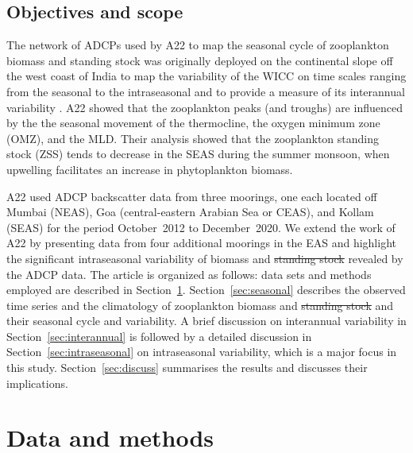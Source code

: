 \documentclass[authoryear,review,11pt]{elsarticle}
\providecommand{\DIFaddtex}[1]{{\protect\color{blue}\uwave{#1}}} %
\providecommand{\DIFdeltex}[1]{{\protect\color{red}\sout{#1}}}                      %
\providecommand{\DIFaddbegin}{} %
\providecommand{\DIFaddend}{} %
\providecommand{\DIFdelbegin}{} %
\providecommand{\DIFdelend}{} %
\providecommand{\DIFadd}[1]{\texorpdfstring{\DIFaddtex{#1}}{#1}} %
\providecommand{\DIFdel}[1]{\texorpdfstring{\DIFdeltex{#1}}{}} %
\begin{document}
\subsection{Objectives and scope}
\label{sec:intro.scope}

The network of ADCPs used by A22 to map the seasonal cycle of zooplankton biomass and standing stock was originally deployed on the continental slope off the west coast of India to map the variability of the WICC on time scales ranging from the seasonal to the intraseasonal and to provide a measure of its interannual variability \citep{amol2014observed, chaudhuri2020observed}. A22 showed that the zooplankton peaks (and troughs) are influenced by the the seasonal movement of the thermocline, the oxygen minimum zone (OMZ), and the MLD. Their analysis showed that the zooplankton standing stock (ZSS) tends to decrease in the SEAS during the summer monsoon, when upwelling facilitates an increase in phytoplankton biomass.

A22 used ADCP backscatter data from three moorings, one each located off Mumbai (NEAS), Goa (central-eastern Arabian Sea or CEAS), and Kollam (SEAS) for the period October~2012 to December~2020.  We extend the work of A22 by presenting data from four additional moorings in the EAS and highlight the significant intraseasonal variability of biomass and \DIFdelbegin \DIFdel{standing stock }\DIFdelend \DIFaddbegin \DIFadd{ZSS }\DIFaddend revealed by the ADCP data. The article is organized as follows: data sets and methods employed are described in Section~\ref{sec:data}. Section~\ref{sec:seasonal} describes the observed time series and the climatology of zooplankton biomass and \DIFdelbegin \DIFdel{standing stock }\DIFdelend \DIFaddbegin \DIFadd{ZSS, }\DIFaddend and their seasonal cycle and variability. A brief discussion on interannual variability in Section~\ref{sec:interannual} is followed by a detailed discussion in Section~\ref{sec:intraseasonal} on intraseasonal variability, which is a major focus in this study. Section~\ref{sec:discuss} summarises the results and discusses their implications.


\section{Data and methods}
\label{sec:data}
\end{document}
